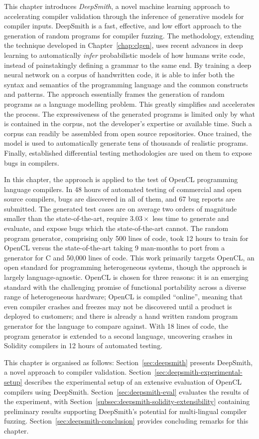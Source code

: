 This chapter introduces \emph{DeepSmith}, a novel machine learning approach to accelerating compiler validation through the inference of generative models for compiler inputs. DeepSmith is a fast, effective, and low effort approach to the generation of random programs for compiler fuzzing. The methodology, extending the technique developed in Chapter~\ref{chap:clgen}, uses recent advances in deep learning to automatically \emph{infer} probabilistic models of how humans write code, instead of painstakingly defining a grammar to the same end. By training a deep neural network on a corpus of handwritten code, it is able to infer both the syntax and semantics of the programming language and the common constructs and patterns. The approach essentially frames the generation of random programs as a language modelling problem. This greatly simplifies and accelerates the process. The expressiveness of the generated programs is limited only by what is contained in the corpus, not the developer's expertise or available time. Such a corpus can readily be assembled from open source repositories. Once trained, the model is used to automatically generate tens of thousands of realistic programs. Finally, established differential testing methodologies are used on them to expose bugs in compilers.

In this chapter, the approach is applied to the test of OpenCL programming language compilers. In 48 hours of automated testing of commercial and open source compilers, bugs are discovered in all of them, and 67 bug reports are submitted. The generated test cases are on average two orders of magnitude smaller than the state-of-the-art, require $3.03\times$ less time to generate and evaluate, and expose bugs which the state-of-the-art cannot. The random program generator, comprising only 500 lines of code, took 12 hours to train for OpenCL versus the state-of-the-art taking 9 man-months to port from a generator for C and 50,000 lines of code.  This work primarily targets OpenCL, an open standard for programming heterogeneous systems, though the approach is largely language-agnostic. OpenCL is chosen for three reasons: it is an emerging standard with the challenging promise of functional portability across a diverse range of heterogeneous hardware; OpenCL is compiled ``online'', meaning that even compiler crashes and freezes may not be discovered until a product is deployed to customers; and there is already a hand written random program generator for the language to compare against. With 18 lines of code, the program generator is extended to a second language, uncovering crashes in Solidity compilers in 12 hours of automated testing.

This chapter is organised as follows:  Section~\ref{sec:deepsmith} presents DeepSmith, a novel approach to compiler validation. Section~\ref{sec:deepsmith-experimental-setup} describes the experimental setup of an extensive evaluation of OpenCL compilers using DeepSmith. Section~\ref{sec:deepsmith-eval} evaluates the results of the experiment, with Section~\ref{subsec:deepsmith-solidity-extensibility} containing preliminary results supporting DeepSmith's potential for multi-lingual compiler fuzzing. Section~\ref{sec:deepsmith-conclusion} provides concluding remarks for this chapter.
